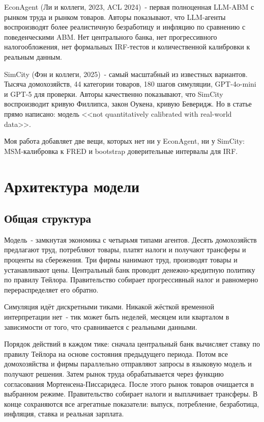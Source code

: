 \documentclass[12pt, a4paper]{article}
\begin{document}
EconAgent \cite{li2023} (Ли и коллеги, 2023, ACL 2024)~- первая полноценная LLM-ABM с рынком труда и рынком товаров. Авторы показывают, что LLM-агенты воспроизводят более реалистичную безработицу и инфляцию по сравнению с поведенческими ABM. Нет центрального банка, нет прогрессивного налогообложения, нет формальных IRF-тестов и количественной калибровки к реальным данным.

SimCity \cite{feng2025} (Фэн и коллеги, 2025)~- самый масштабный из известных вариантов. Тысяча домохозяйств, 44 категории товаров, 180 шагов симуляции, GPT-4o-mini и GPT-5 для проверки. Авторы качественно показывают, что SimCity воспроизводит кривую Филлипса, закон Оукена, кривую Беверидж. Но в статье прямо написано: модель <<not quantitatively calibrated with real-world data>>.

Моя работа добавляет две вещи, которых нет ни у EconAgent, ни у SimCity: MSM-калибровка к FRED и bootstrap доверительные интервалы для IRF.


\section{Архитектура модели}

\subsection{Общая структура}

Модель~- замкнутая экономика с четырьмя типами агентов. Десять домохозяйств предлагают труд, потребляют товары, платят налоги и получают трансферы и проценты на сбережения. Три фирмы нанимают труд, производят товары и устанавливают цены. Центральный банк проводит денежно-кредитную политику по правилу Тейлора. Правительство собирает прогрессивный налог и равномерно перераспределяет его обратно.

Симуляция идёт дискретными тиками. Никакой жёсткой временной интерпретации нет~- тик может быть неделей, месяцем или кварталом в зависимости от того, что сравнивается с реальными данными.

Порядок действий в каждом тике: сначала центральный банк вычисляет ставку по правилу Тейлора на основе состояния предыдущего периода. Потом все домохозяйства и фирмы параллельно отправляют запросы в языковую модель и получают решения. Затем рынок труда обрабатывается через функцию согласования Мортенсена-Писсаридеса. После этого рынок товаров очищается в выбранном режиме. Правительство собирает налоги и выплачивает трансферы. В конце сохраняются все агрегатные показатели: выпуск, потребление, безработица, инфляция, ставка и реальная зарплата.
\end{document}
